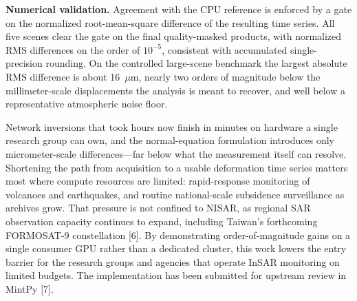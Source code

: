 \documentclass[a4paper]{article}
\begin{document}
\textbf{Numerical validation.}
Agreement with the CPU reference is enforced by a gate
on the normalized root-mean-square difference of the resulting time series.
All five scenes clear the gate on the final quality-masked products,
with normalized RMS differences on the order of $10^{-5}$,
consistent with accumulated single-precision rounding.
On the controlled large-scene benchmark
the largest absolute RMS difference is about 16~$\mu$m,
nearly two orders of magnitude below the millimeter-scale displacements
the analysis is meant to recover,
and well below a representative atmospheric noise floor.

Network inversions that took hours now finish in minutes
on hardware a single research group can own,
and the normal-equation formulation introduces only micrometer-scale
differences---far below what the measurement itself can resolve.
Shortening the path from acquisition to a usable deformation time series
matters most where compute resources are limited:
rapid-response monitoring of volcanoes and earthquakes,
and routine national-scale subsidence surveillance as archives grow.
That pressure is not confined to NISAR,
as regional SAR observation capacity continues to expand,
including Taiwan's forthcoming FORMOSAT-9 constellation [6].
By demonstrating order-of-magnitude gains on a single consumer GPU
rather than a dedicated cluster,
this work lowers the entry barrier for the research groups and agencies
that operate InSAR monitoring on limited budgets.
The implementation has been submitted for upstream review in MintPy [7].

\end{document}
